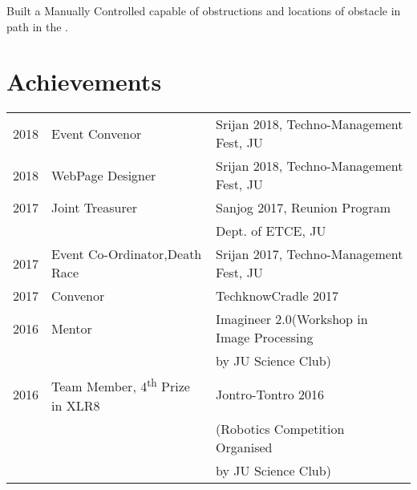 \documentclass[]{deedy-resume-openfont}
\begin{document}
\begin{minipage}[t]{0.66\textwidth}
Built a Manually Controlled  capable of  obstructions and locations of obstacle in path in the .
\sectionsep










\section{Achievements} 
\begin{tabular}{rll}
2018		 & Event Convenor  & Srijan 2018, Techno-Management Fest, JU\\
2018         & WebPage Designer &Srijan 2018, Techno-Management Fest, JU\\
2017		 & Joint Treasurer  &Sanjog 2017, Reunion Program \\& & Dept. of ETCE, JU\\
2017		 & Event Co-Ordinator,Death Race &Srijan 2017, Techno-Management Fest, JU\\
2017		 & Convenor  & TechknowCradle 2017\\
2016         & Mentor    & Imagineer 2.0(Workshop in Image Processing \\ & & by JU Science Club)\\
2016		 & Team Member, 4\textsuperscript{th} Prize in XLR8  & Jontro-Tontro 2016\\ & & (Robotics Competition Organised \\ & &by JU Science Club)\\
\end{tabular}
\sectionsep

\end{minipage}
\end{document}
